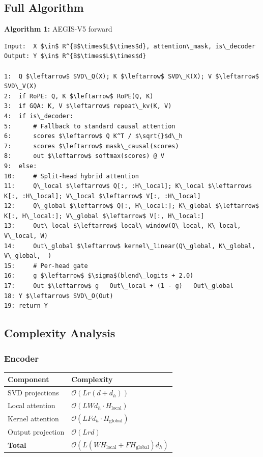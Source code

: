 \subsection{Full Algorithm}

\textbf{Algorithm 1:} AEGIS-V5 forward
\begin{lstlisting}
Input:  X $\in$ R^{B$\times$L$\times$d}, attention\_mask, is\_decoder
Output: Y $\in$ R^{B$\times$L$\times$d}

1:  Q $\leftarrow$ SVD\_Q(X); K $\leftarrow$ SVD\_K(X); V $\leftarrow$ SVD\_V(X)
2:  if RoPE: Q, K $\leftarrow$ RoPE(Q, K)
3:  if GQA: K, V $\leftarrow$ repeat\_kv(K, V)
4:  if is\_decoder:
5:      # Fallback to standard causal attention
6:      scores $\leftarrow$ Q K^T / $\sqrt{}$d\_h
7:      scores $\leftarrow$ mask\_causal(scores)
8:      out $\leftarrow$ softmax(scores) @ V
9:  else:
10:     # Split-head hybrid attention
11:     Q\_local $\leftarrow$ Q[:, :H\_local]; K\_local $\leftarrow$ K[:, :H\_local]; V\_local $\leftarrow$ V[:, :H\_local]
12:     Q\_global $\leftarrow$ Q[:, H\_local:]; K\_global $\leftarrow$ K[:, H\_local:]; V\_global $\leftarrow$ V[:, H\_local:]
13:     Out\_local $\leftarrow$ local\_window(Q\_local, K\_local, V\_local, W)
14:     Out\_global $\leftarrow$ kernel\_linear(Q\_global, K\_global, V\_global,  )
15:     # Per-head gate
16:     g $\leftarrow$ $\sigma$(blend\_logits + 2.0)
17:     Out $\leftarrow$ g   Out\_local + (1 - g)   Out\_global
18: Y $\leftarrow$ SVD\_O(Out)
19: return Y
\end{lstlisting}

\subsection{Complexity Analysis}

\subsubsection{Encoder}

\begin{table}[H]
\centering
\small
\begin{tabular}{ll}
\toprule
\textbf{Component} & \textbf{Complexity} \\
\midrule
SVD projections & $\mathcal{O}(L r (d + d_h))$ \\
Local attention & $\mathcal{O}(L W d_h \cdot H_\text{local})$ \\
Kernel attention & $\mathcal{O}(L F d_h \cdot H_\text{global})$ \\
Output projection & $\mathcal{O}(L r d)$ \\
\textbf{Total} & $\mathcal{O}(L(W H_\text{local} + F H_\text{global}) d_h)$ \\
\bottomrule
\end{tabular}
\end{table}

